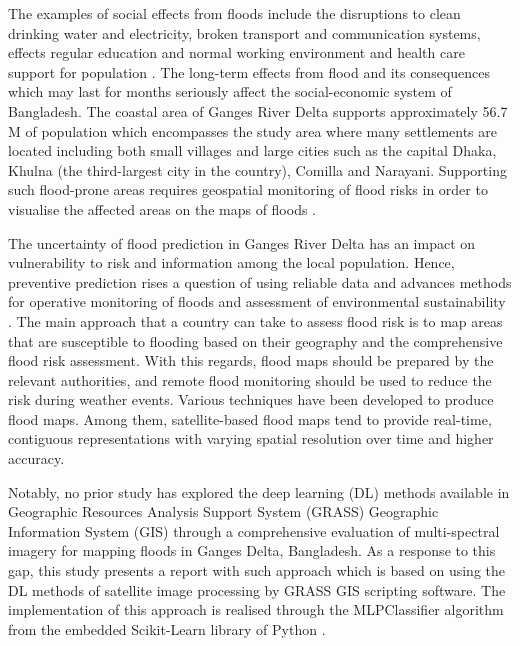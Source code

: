 \documentclass[water,article,submit,pdftex,moreauthors]{Definitions/mdpi}
\begin{document}
The examples of social effects from floods include the disruptions to clean drinking water and electricity, broken transport and communication systems, effects regular education and normal working environment and health care support for population \cite{JERIN2023103851,NAHIN2023e14520}. The long-term effects from flood and its consequences which may last for months  seriously affect the social-economic system of Bangladesh. The coastal area of Ganges River Delta supports approximately 56.7 M of population which encompasses the study area \cite{DAS2021101983} where many settlements are located including both small villages and large cities such as the capital Dhaka, Khulna (the third-largest city in the country), Comilla and Narayani. Supporting such flood-prone areas requires geospatial monitoring of flood risks in order to visualise the affected areas on the maps of floods \cite{Alietal,AZAD2023100498}.

The uncertainty of flood prediction in Ganges River Delta has an impact on vulnerability to risk and information among the local population. Hence, preventive prediction rises a question of using reliable data and advances methods for operative monitoring of floods and assessment of environmental sustainability \cite{NICHOLLS2016370}. The main approach that a country can take to assess flood risk is to map areas that are susceptible to flooding based on their geography and the comprehensive flood risk assessment. With this regards, flood maps should be prepared by the relevant authorities, and remote flood monitoring should be used to reduce the risk during weather events. Various techniques have been developed to produce flood maps. Among them, satellite-based flood maps tend to provide real-time, contiguous representations with varying spatial resolution over time and higher accuracy.

Notably, no prior study has explored the deep learning (DL) methods available in Geographic Resources Analysis Support System (GRASS) Geographic Information System (GIS) \cite{GRASS_GIS_software} through a comprehensive evaluation of multi-spectral imagery for mapping floods in Ganges Delta, Bangladesh. As a response to this gap, this study presents a report with such approach which is based on using the DL methods of satellite image processing by GRASS GIS scripting software. The implementation of this approach is realised through the MLPClassifier algorithm from the embedded Scikit-Learn library of Python \cite{pedregosa2011scikit,van1995python}. 

\end{document}

